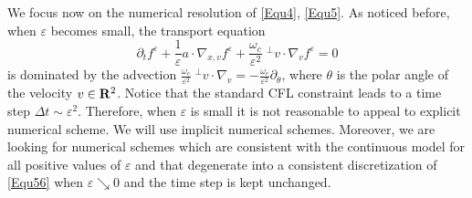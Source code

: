 \documentclass[12pt, a4paper]{article}
\providecommand\mathbb{\bf}
\newcommand\R{{\mathbb R}}
\newcommand{\eps}[0]{
\varepsilon}
\newcommand{\fe}[0]{
f ^\varepsilon}
\newcommand{\nxv}[0]{
\nabla_{x,v}}
\begin{document}
We focus now on the numerical resolution of \eqref{Equ4}, \eqref{Equ5}. As noticed before, when $\eps $ becomes small, the transport equation
\begin{equation}
\label{Equ55} \partial _t \fe + \frac{1}{\eps} a \cdot \nxv \fe + \frac{\omega _c}{\eps ^2} \;^\perp v \cdot \nabla _v \fe = 0
\end{equation}
is dominated by the advection $\frac{\omega _c}{\eps ^2} \;^\perp v \cdot \nabla _v = - \frac{\omega _c}{\eps ^2} \partial _\theta$, where $\theta$ is the polar angle of the velocity $v \in \R^2$. Notice that the standard CFL constraint leads to a time step $\Delta t \sim \eps ^2$. Therefore, when $\eps$ is small it is not reasonable to appeal to explicit numerical scheme. We will use implicit numerical schemes. Moreover, we are looking for numerical schemes which are consistent with the continuous model for all positive values of $\eps$ and that degenerate into a consistent discretization of \eqref{Equ56} when $\eps \searrow 0 $ and the time step is kept unchanged.
\end{document}
